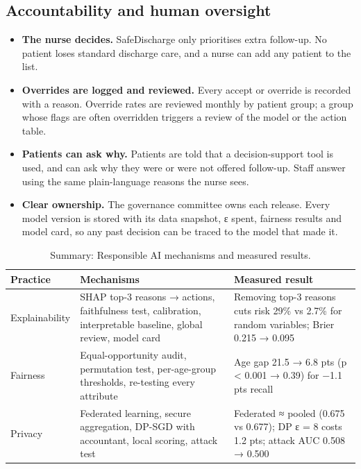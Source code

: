 \documentclass[10pt,a4paper]{article}
\begin{document}
\subsection{Accountability and human oversight}\label{sec:4.5}
\begin{itemize}
\item \textbf{The nurse decides.} SafeDischarge only prioritises extra follow-up. No patient loses standard discharge care, and a nurse can add any patient to the list.
\item \textbf{Overrides are logged and reviewed.} Every accept or override is recorded with a reason. Override rates are reviewed monthly by patient group; a group whose flags are often overridden triggers a review of the model or the action table.
\item \textbf{Patients can ask why.} Patients are told that a decision-support tool is used, and can ask why they were or were not offered follow-up. Staff answer using the same plain-language reasons the nurse sees.
\item \textbf{Clear ownership.} The governance committee owns each release. Every model version is stored with its data snapshot, ε spent, fairness results and model card, so any past decision can be traced to the model that made it.
\end{itemize}
\begin{table}[htbp]
\centering
\caption{Summary: Responsible AI mechanisms and measured results.}\label{tab:6}
\begin{tabularx}{\textwidth}{>{\raggedright\arraybackslash\hsize=0.459\hsize}X>{\raggedright\arraybackslash\hsize=1.384\hsize}X>{\raggedright\arraybackslash\hsize=1.158\hsize}X}
\toprule
\textbf{Practice} & \textbf{Mechanisms} & \textbf{Measured result} \\
\midrule
Explainability & SHAP top-3 reasons → actions, faithfulness test, calibration, interpretable baseline, global review, model card & Removing top-3 reasons cuts risk 29\% vs 2.7\% for random variables; Brier 0.215 → 0.095 \\
Fairness & Equal-opportunity audit, permutation test, per-age-group thresholds, re-testing every attribute & Age gap 21.5 → 6.8 pts (p < 0.001 → 0.39) for −1.1 pts recall \\
Privacy & Federated learning, secure aggregation, DP-SGD with accountant, local scoring, attack test & Federated ≈ pooled (0.675 vs 0.677); DP ε = 8 costs 1.2 pts; attack AUC 0.508 → 0.500 \\
\bottomrule
\end{tabularx}
\end{table}
\end{document}

